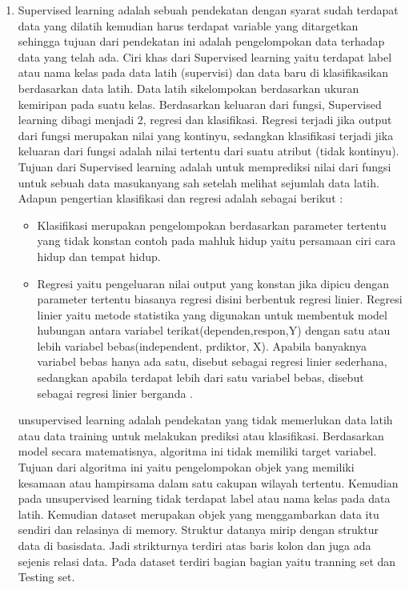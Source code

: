 \begin{enumerate}
\item
Supervised learning adalah sebuah pendekatan dengan syarat sudah terdapat data yang dilatih kemudian harus terdapat variable yang ditargetkan sehingga tujuan dari pendekatan ini adalah pengelompokan data terhadap data yang telah ada. Ciri khas dari Supervised learning yaitu terdapat label atau nama kelas pada data latih (supervisi) dan data baru di klasifikasikan berdasarkan data latih. Data latih sikelompokan berdasarkan ukuran kemiripan pada suatu kelas. Berdasarkan keluaran dari fungsi, Supervised learning dibagi menjadi 2, regresi dan klasifikasi. Regresi terjadi jika output dari fungsi merupakan nilai yang kontinyu, sedangkan klasifikasi terjadi jika keluaran dari fungsi adalah nilai tertentu dari suatu atribut (tidak kontinyu). Tujuan dari Supervised learning adalah untuk memprediksi nilai dari fungsi untuk sebuah data masukanyang sah setelah melihat sejumlah data latih\cite{februariyanti2012klasifikasi}.\\
Adapun pengertian klasifikasi dan regresi adalah sebagai berikut :
\begin{itemize}
\item
Klasifikasi merupakan pengelompokan berdasarkan parameter tertentu yang tidak konstan contoh pada mahluk hidup yaitu persamaan ciri cara hidup dan tempat hidup.
\item
Regresi yaitu pengeluaran nilai output yang konstan jika dipicu dengan parameter tertentu biasanya regresi disini berbentuk regresi linier. Regresi linier yaitu metode statistika yang digunakan untuk membentuk model hubungan antara variabel terikat(dependen,respon,Y) dengan satu atau lebih variabel bebas(independent, prdiktor, X). Apabila banyaknya variabel bebas hanya ada satu, disebut sebagai regresi linier sederhana, sedangkan apabila terdapat lebih dari satu variabel bebas, disebut sebagai regresi linier berganda \cite{kurniawan2008regresi}.
\end{itemize}
unsupervised learning adalah pendekatan yang tidak memerlukan data latih atau data training untuk melakukan prediksi atau klasifikasi. Berdasarkan model secara matematisnya, algoritma ini tidak memiliki target variabel. Tujuan dari algoritma ini yaitu pengelompokan objek yang memiliki kesamaan atau hampirsama dalam satu cakupan wilayah tertentu. Kemudian pada unsupervised learning tidak terdapat label atau nama kelas pada data latih.
Kemudian dataset merupakan objek yang menggambarkan data itu sendiri dan relasinya di memory. Struktur datanya mirip dengan struktur data di basisdata. Jadi strikturnya terdiri atas baris kolon dan juga ada sejenis relasi data. Pada dataset terdiri bagian bagian yaitu tranning set dan Testing set.

\end{enumerate}
